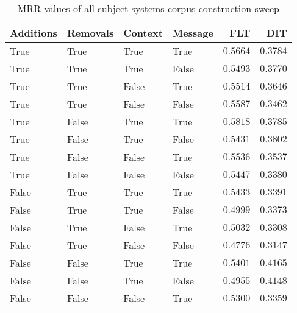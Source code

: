 
\begin{table}
\begin{spacing}{1.2}
\centering
\caption{MRR values of all subject systems corpus construction sweep}
\label{table:all_corpus_sweep}
\vspace{0.2em}
\begin{tabular}{llll|rr}
\toprule
Additions & Removals & Context & Message &           FLT &           DIT \\
\midrule
     True &     True &    True &    True &      $0.5664$ &      $0.3784$ \\
     True &     True &    True &   False &      $0.5493$ &      $0.3770$ \\
     True &     True &   False &    True &      $0.5514$ &      $0.3646$ \\
     True &     True &   False &   False &      $0.5587$ &      $0.3462$ \\
     True &    False &    True &    True & $\bm{0.5818}$ &      $0.3785$ \\
     True &    False &    True &   False &      $0.5431$ &      $0.3802$ \\
     True &    False &   False &    True &      $0.5536$ &      $0.3537$ \\
     True &    False &   False &   False &      $0.5447$ &      $0.3380$ \\
    False &     True &    True &    True &      $0.5433$ &      $0.3391$ \\
    False &     True &    True &   False &      $0.4999$ &      $0.3373$ \\
    False &     True &   False &    True &      $0.5032$ &      $0.3308$ \\
    False &     True &   False &   False &      $0.4776$ &      $0.3147$ \\
    False &    False &    True &    True &      $0.5401$ & $\bm{0.4165}$ \\
    False &    False &    True &   False &      $0.4955$ &      $0.4148$ \\
    False &    False &   False &    True &      $0.5300$ &      $0.3359$ \\
\bottomrule
\end{tabular}

\end{spacing}
\end{table}
